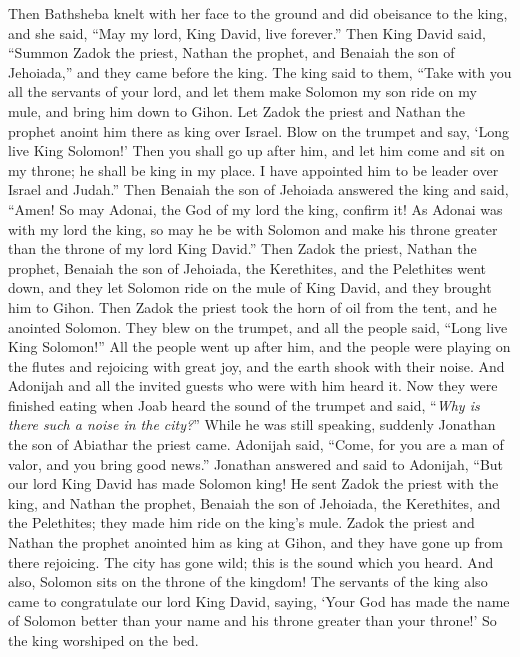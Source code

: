 \begin{biblechapter}
\verse Then Bathsheba knelt with her face to the ground and did obeisance to the king, and she said, “May my lord, King David, live forever.”
 Then King David said, “Summon Zadok the priest, Nathan the prophet, and Benaiah the son of Jehoiada,” and they came before the king.
\verse The king said to them, “Take with you all the servants of your lord, and let them make Solomon my son ride on my mule, and bring him down to Gihon.
\verse Let Zadok the priest and Nathan the prophet anoint him there as king over Israel. Blow on the trumpet and say, ‘Long live King Solomon!’
\verse Then you shall go up after him, and let him come and sit on my throne; he shall be king in my place. I have appointed him to be leader over Israel and Judah.”
\verse Then Benaiah the son of Jehoiada answered the king and said, “Amen! So may Adonai, the God of my lord the king, confirm it!
\verse As Adonai was with my lord the king, so may he be with Solomon and make his throne greater than the throne of my lord King David.”
\verse Then Zadok the priest, Nathan the prophet, Benaiah the son of Jehoiada, the Kerethites, and the Pelethites went down, and they let Solomon ride on the mule of King David, and they brought him to Gihon.
\verse Then Zadok the priest took the horn of oil from the tent, and he anointed Solomon. They blew on the trumpet, and all the people said, “Long live King Solomon!”
\verse All the people went up after him, and the people were playing on the flutes and rejoicing with great joy, and the earth shook with their noise.
 And Adonijah and all the invited guests who were with him heard it. Now they were finished eating when Joab heard the sound of the trumpet and said, “\textit{Why is there such a noise in the city?}”
\verse While he was still speaking, suddenly Jonathan the son of Abiathar the priest came. Adonijah said, “Come, for you are a man of valor, and you bring good news.”
\verse Jonathan answered and said to Adonijah, “But our lord King David has made Solomon king!
\verse He sent Zadok the priest with the king, and Nathan the prophet, Benaiah the son of Jehoiada, the Kerethites, and the Pelethites; they made him ride on the king’s mule.
\verse Zadok the priest and Nathan the prophet anointed him as king at Gihon, and they have gone up from there rejoicing. The city has gone wild; this is the sound which you heard.
\verse And also, Solomon sits on the throne of the kingdom!
\verse The servants of the king also came to congratulate our lord King David, saying, ‘Your God has made the name of Solomon better than your name and his throne greater than your throne!’ So the king worshiped on the bed.

\end{biblechapter}
